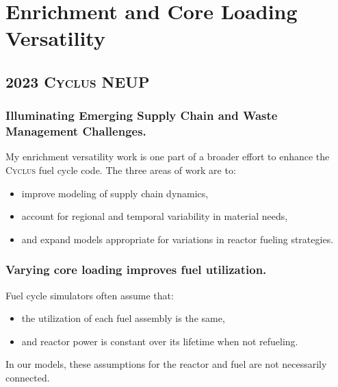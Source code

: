 \documentclass[9pt]{beamer}
\newcommand{\cyclus}{\textsc{Cyclus}\xspace}
\begin{document}
\section{Enrichment and Core Loading Versatility}
\subsection{2023 \cyclus NEUP}

\begin{frame}
  \frametitle{Illuminating Emerging Supply Chain and Waste Management
  Challenges.}
  My enrichment versatility work is one part of a broader effort to enhance the \cyclus fuel cycle code. The three areas of work are to:
  \begin{itemize}[<+->]
    \item improve modeling of supply chain dynamics,
    \item account for regional and temporal variability in material needs,
    \item and expand models appropriate for variations in reactor fueling strategies.
  \end{itemize}
\end{frame}

\begin{frame}
  \frametitle{Varying core loading improves fuel utilization.}
  Fuel cycle simulators often \cite{out_of_core} assume that:
  \begin{itemize}
    \item the utilization of each fuel assembly is the same,\pause
    \item and reactor power is constant over its lifetime when not refueling.\pause
  \end{itemize}
  In our models, these assumptions for the reactor and fuel are not necessarily connected.
\end{frame}
\end{document}
